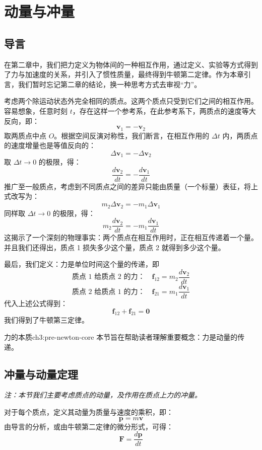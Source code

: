 \chapter{动量与冲量}

\section{导言}
在第二章中，我们把力定义为物体间的一种相互作用，通过定义、实验等方式得到了力与加速度的关系，并引入了惯性质量，最终得到牛顿第二定律。作为本章引言，我们暂时忘记第二章的结论，换一种思考方式去审视“力”。

考虑两个除运动状态外完全相同的质点。这两个质点只受到它们之间的相互作用。容易想象，任意时刻 $t$，存在这样一个参考系，在此参考系下，两质点的速度等大反向，即：
\[ \boldsymbol{v}_1 = -\boldsymbol{v}_2 \]
取两质点中点 $O$。根据空间反演对称性，我们断言，在相互作用的 $\Delta t$ 内，两质点的速度增量也是等值反向的：
\[ \Delta \boldsymbol{v}_1 = -\Delta \boldsymbol{v}_2 \]
取 $\Delta t \to 0$ 的极限，得：
\[ \frac{d\boldsymbol{v}_2}{dt} = -\frac{d\boldsymbol{v}_1}{dt} \]
推广至一般质点，考虑到不同质点之间的差异只能由质量（一个标量）表征，将上式改写为：
\[ m_2 \Delta \boldsymbol{v}_2 = -m_1 \Delta \boldsymbol{v}_1 \]
同样取 $\Delta t \to 0$ 的极限，得：
\[ m_2 \frac{d\boldsymbol{v}_2}{dt} = -m_1 \frac{d\boldsymbol{v}_1}{dt} \]
这揭示了一个深刻的物理事实：两个质点在相互作用时，正在相互传递着一个量。并且我们还得出，质点 1 损失多少这个量，质点 2 就得到多少这个量。

最后，我们定义：力是单位时间这个量的传递，即
\[ \text{质点 1 给质点 2 的力：} \quad \boldsymbol{f}_{12} = m_2 \frac{d\boldsymbol{v}_2}{dt} \]
\[ \text{质点 2 给质点 1 的力：} \quad \boldsymbol{f}_{21} = m_1 \frac{d\boldsymbol{v}_1}{dt} \]
代入上述公式得到：
\[ \boldsymbol{f}_{12} + \boldsymbol{f}_{21} = \boldsymbol{0} \]
我们得到了牛顿第三定律。

\begin{knowledge}{力的本质}{ch3:pre-newton-core}
	本节旨在帮助读者理解重要概念：力是动量的传递。
\end{knowledge}

\newpage

\section{冲量与动量定理}
\textit{注：本节我们主要考虑质点的动量，及作用在质点上力的冲量。}

\vspace{1em}
\noindent 对于每个质点，定义其动量为质量与速度的乘积，即：
\[ \boldsymbol{p} = m\boldsymbol{v} \]
\noindent 由导言的分析，或由牛顿第二定律的微分形式，可得：
\[ \boxed{\boldsymbol{F} = \frac{d\boldsymbol{p}}{dt}} \]

